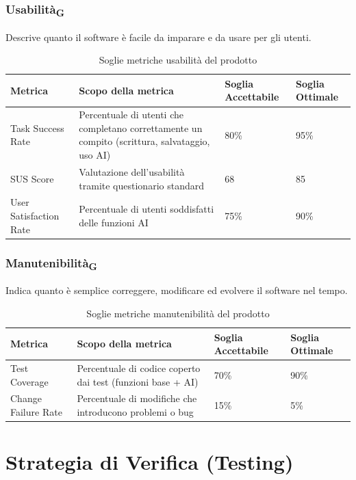 \documentclass[11pt,a4paper]{article}
\begin{document}
\subsubsection{Usabilità\textsubscript{G}}
Descrive quanto il software è facile da imparare e da usare per gli utenti.
\begin{table}[H]
\centering
\renewcommand{\arraystretch}{1.5}
\begin{tabular}{|M{0.25\textwidth}|M{0.35\textwidth}|M{0.15\textwidth}|M{0.15\textwidth}|}
\hline
\textbf{Metrica} & \textbf{Scopo della metrica} & \textbf{Soglia Accettabile} & \textbf{Soglia Ottimale} \\
\hline
Task Success Rate & Percentuale di utenti che completano correttamente un compito (scrittura, salvataggio, uso AI) & 80\% & 95\% \\ \hline
SUS Score & Valutazione dell’usabilità tramite questionario standard & 68 & 85 \\ \hline
User Satisfaction Rate & Percentuale di utenti soddisfatti delle funzioni AI & 75\% & 90\% \\
\hline
\end{tabular}
\caption{Soglie metriche usabilità del prodotto}
\end{table}

\subsubsection{Manutenibilità\textsubscript{G}}
Indica quanto è semplice correggere, modificare ed evolvere il software nel tempo.
\begin{table}[H]
\centering
\renewcommand{\arraystretch}{1.5}
\begin{tabular}{|M{0.25\textwidth}|M{0.35\textwidth}|M{0.15\textwidth}|M{0.15\textwidth}|}
\hline
\textbf{Metrica} & \textbf{Scopo della metrica} & \textbf{Soglia Accettabile} & \textbf{Soglia Ottimale} \\
\hline
Test Coverage & Percentuale di codice coperto dai test (funzioni base + AI) & 70\% & 90\% \\ \hline
Change Failure Rate & Percentuale di modifiche che introducono problemi o bug & 15\% & 5\% \\
\hline
\end{tabular}
\caption{Soglie metriche manutenibilità del prodotto}
\end{table}

\newpage
\section{Strategia di Verifica (Testing)}
\end{document}
